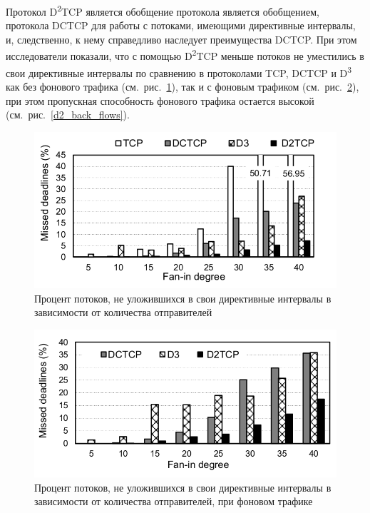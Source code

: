 \documentclass[14pt, a4paper,oneside]{extarticle}
\begin{document}
Протокол D\textsuperscript{2}TCP является обобщение протокола является обобщением, протокола DCTCP для работы с потоками, имеющими директивные интервалы, и, следственно, к нему справедливо наследует преимущества DCTCP. При этом исследователи показали, что с помощью D\textsuperscript{2}TCP меньше потоков не уместились в свои директивные интервалы по сравнению в протоколами TCP, DCTCP и D\textsuperscript{3} как без фонового трафика (см.~рис.~\ref{d2_missed_deadlines}), так и с фоновым трафиком (см.~рис.~\ref{d2_back_missed_deadlines}), при этом пропускная способность фонового трафика остается высокой (см.~рис.~\ref{d2_back_flows}).
\begin{figure}
	\includegraphics[width=\linewidth]{d2_missed_deadlines}
	\caption{Процент потоков, не уложившихся в свои директивные интервалы в зависимости от количества отправителей}
	\label{d2_missed_deadlines}
\end{figure}

\begin{figure}
	\includegraphics[width=\linewidth]{d2_back_missed_deadlines}
	\caption{Процент потоков, не уложившихся в свои директивные интервалы в зависимости от количества отправителей, при фоновом трафике}
	\label{d2_back_missed_deadlines}
\end{figure}
\end{document}
